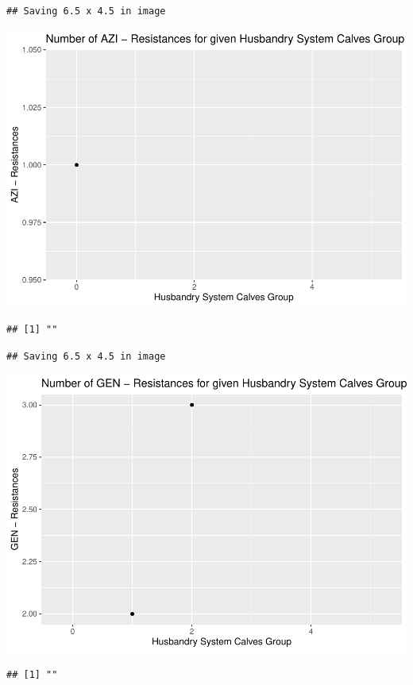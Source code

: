 \documentclass[
]{article}
\begin{document}
\begin{verbatim}
## Saving 6.5 x 4.5 in image
\end{verbatim}

\includegraphics{NResistenzen_files/figure-latex/binary_or_nominal_variables-33.pdf}

\begin{verbatim}
## [1] ""
\end{verbatim}

\begin{verbatim}
## Saving 6.5 x 4.5 in image
\end{verbatim}

\includegraphics{NResistenzen_files/figure-latex/binary_or_nominal_variables-34.pdf}

\begin{verbatim}
## [1] ""
\end{verbatim}
\end{document}
